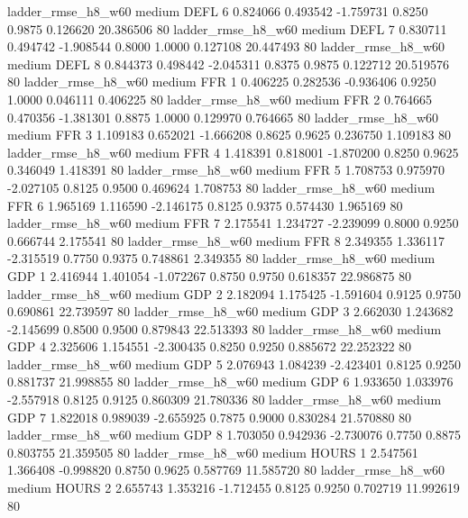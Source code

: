     ladder_rmse_h8_w60     medium     DEFL                 6  0.824066 0.493542 -1.759731 0.8250 0.9875  0.126620   20.386506 80
    ladder_rmse_h8_w60     medium     DEFL                 7  0.830711 0.494742 -1.908544 0.8000 1.0000  0.127108   20.447493 80
    ladder_rmse_h8_w60     medium     DEFL                 8  0.844373 0.498442 -2.045311 0.8375 0.9875  0.122712   20.519576 80
    ladder_rmse_h8_w60     medium      FFR                 1  0.406225 0.282536 -0.936406 0.9250 1.0000  0.046111    0.406225 80
    ladder_rmse_h8_w60     medium      FFR                 2  0.764665 0.470356 -1.381301 0.8875 1.0000  0.129970    0.764665 80
    ladder_rmse_h8_w60     medium      FFR                 3  1.109183 0.652021 -1.666208 0.8625 0.9625  0.236750    1.109183 80
    ladder_rmse_h8_w60     medium      FFR                 4  1.418391 0.818001 -1.870200 0.8250 0.9625  0.346049    1.418391 80
    ladder_rmse_h8_w60     medium      FFR                 5  1.708753 0.975970 -2.027105 0.8125 0.9500  0.469624    1.708753 80
    ladder_rmse_h8_w60     medium      FFR                 6  1.965169 1.116590 -2.146175 0.8125 0.9375  0.574430    1.965169 80
    ladder_rmse_h8_w60     medium      FFR                 7  2.175541 1.234727 -2.239099 0.8000 0.9250  0.666744    2.175541 80
    ladder_rmse_h8_w60     medium      FFR                 8  2.349355 1.336117 -2.315519 0.7750 0.9375  0.748861    2.349355 80
    ladder_rmse_h8_w60     medium      GDP                 1  2.416944 1.401054 -1.072267 0.8750 0.9750  0.618357   22.986875 80
    ladder_rmse_h8_w60     medium      GDP                 2  2.182094 1.175425 -1.591604 0.9125 0.9750  0.690861   22.739597 80
    ladder_rmse_h8_w60     medium      GDP                 3  2.662030 1.243682 -2.145699 0.8500 0.9500  0.879843   22.513393 80
    ladder_rmse_h8_w60     medium      GDP                 4  2.325606 1.154551 -2.300435 0.8250 0.9250  0.885672   22.252322 80
    ladder_rmse_h8_w60     medium      GDP                 5  2.076943 1.084239 -2.423401 0.8125 0.9250  0.881737   21.998855 80
    ladder_rmse_h8_w60     medium      GDP                 6  1.933650 1.033976 -2.557918 0.8125 0.9125  0.860309   21.780336 80
    ladder_rmse_h8_w60     medium      GDP                 7  1.822018 0.989039 -2.655925 0.7875 0.9000  0.830284   21.570880 80
    ladder_rmse_h8_w60     medium      GDP                 8  1.703050 0.942936 -2.730076 0.7750 0.8875  0.803755   21.359505 80
    ladder_rmse_h8_w60     medium    HOURS                 1  2.547561 1.366408 -0.998820 0.8750 0.9625  0.587769   11.585720 80
    ladder_rmse_h8_w60     medium    HOURS                 2  2.655743 1.353216 -1.712455 0.8125 0.9250  0.702719   11.992619 80

